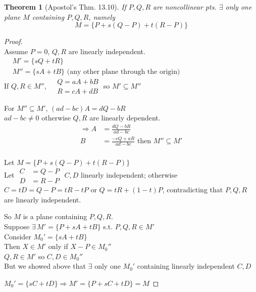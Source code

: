 \documentclass[twoside]{amsart}
\theoremstyle{plain}
\newtheorem{theorem}{Theorem}
\theoremstyle{definition}
\begin{document}
\begin{theorem}[Apostol's Thm. 13.10] If $P,Q,R$ are noncollinear pts. $\exists$ only one plane $M$ containing $P,Q,R$, namely
\[
M = \{ P + s(Q-P) + t(R-P) \} 
\]
\end{theorem}
\begin{proof} \quad \\
 Assume $P=0$, $Q,R$ are linearly independent.  \\
 $\begin{aligned}
   & M' = \{ sQ + tR \} \\
   & M'' = \{ sA + tB \} \text{ (any other plane through the origin) } 
\end{aligned}$  \medskip \\
 If $Q,R \in M''$, \quad $\begin{aligned}
   & Q = aA + bB \\
   & R = cA + dB
\end{aligned}$ \quad so $M' \subseteq M''$

For $M'' \subseteq M'$, $(ad-bc)A = dQ - bR$ \\
\phantom{ For $M''\subseteq M'$ } $ad-bc \neq 0$ otherwise $Q,R$ are linearly dependent.  
\[
\begin{aligned}
  \Longrightarrow A & = \frac{ dQ - bR }{ ad-bc} \\
  B & = \frac{-cQ + aR }{ ad-bc } \text{ then } M'' \subseteq M'
\end{aligned}
\]
\quad \\

Let $M = \{ P + s(Q-P) + t(R-P) \}$ \\
\phantom{ Let } Let $\begin{aligned}
  C & = Q-P \\
  D & = R - P
\end{aligned}$ \quad $C,D$ linearly independent; otherwise $C=tD = Q-P = tR - tP$ or $Q = tR + (1-t)P$, contradicting that $P,Q,R$ are linearly independent.  

So $M$ is a plane containing $P,Q,R$.  \\
Suppose $\exists \, M' = \{ P + sA + tB \}$ s.t. $P,Q,R \in M'$ \\
\phantom{ Suppose } Consider $M_0' = \{ sA + tB \}$ \\
\phantom{ Suppose Consid} Then $X \in M'$ only if $X-P \in M_0''$  \\
\phantom{ Suppose Consid Then} $Q,R \in M'$ so $C,D \in M_0''$ \\
\phantom{ Suppose Consider Then } But we showed above that $\exists$ only one $M_0'$ containing linearly independent $C,D$

$M_0' = \{ sC + tD \} \Longrightarrow M' = \{ P + sC + tD \} = M$
\end{proof}
\end{document}
